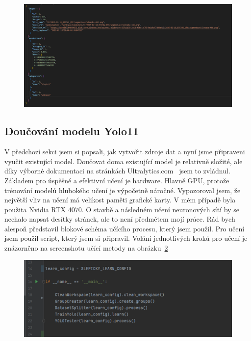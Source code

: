 \begin{figure}[htbp]
    \centering
    \includegraphics[width=1.0\textwidth]{img/coco_format}
    \label{fig:coco_format}
\end{figure}

\subsection*{Doučování modelu Yolo11}\label{subsec:doucovani-modelu-yolov11-o-novou-tridu}
V předchozí sekci jsem si popsali, jak vytvořit zdroje dat a nyní jsme připraveni vyučit existující model.
Doučovat doma existující model je relativně složité, ale díky výborné dokumentaci na stránkách Ultralytics.com~\cite{ultralytics_yolo} jsem to zvládnul.
Základem pro úspěšné a efektivní učení je hardware.
Hlavně GPU, protože trénování modelů hlubokého učení je výpočetně náročné.
Vypozoroval jsem, že největší vliv na učení má velikost paměti grafické karty.
V mém případě byla použita Nvidia RTX 4070.
O stavbě a následném učení neuronových sítí by se nechalo napsat desítky stránek, ale to není předmětem mojí práce.
Rád bych alespoň představil blokové schéma učícího procesu, který jsem použil.\newline
\newline
Pro učení jsem použil script, který jsem si připravil.
Volání jednotlivých kroků pro učení je znázorněno na screenshotu učící metody na obrázku~\ref{fig:learn_script}

\begin{figure}[htbp]
    \centering
    \includegraphics[width=1.0\textwidth]{img/learn_script}
    \label{fig:learn_script}
\end{figure}

